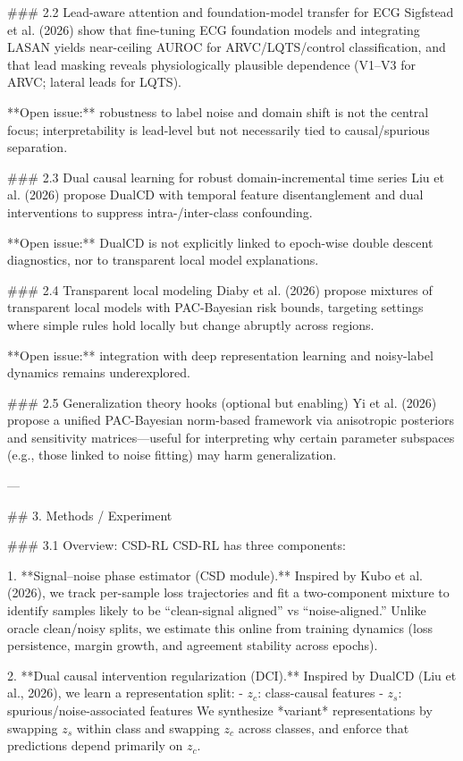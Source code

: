 ### 2.2 Lead-aware attention and foundation-model transfer for ECG  
Sigfstead et al. (2026) show that fine-tuning ECG foundation models and integrating LASAN yields near-ceiling AUROC for ARVC/LQTS/control classification, and that lead masking reveals physiologically plausible dependence (V1–V3 for ARVC; lateral leads for LQTS).

**Open issue:** robustness to label noise and domain shift is not the central focus; interpretability is lead-level but not necessarily tied to causal/spurious separation.

### 2.3 Dual causal learning for robust domain-incremental time series  
Liu et al. (2026) propose DualCD with temporal feature disentanglement and dual interventions to suppress intra-/inter-class confounding.

**Open issue:** DualCD is not explicitly linked to epoch-wise double descent diagnostics, nor to transparent local model explanations.

### 2.4 Transparent local modeling  
Diaby et al. (2026) propose mixtures of transparent local models with PAC-Bayesian risk bounds, targeting settings where simple rules hold locally but change abruptly across regions.

**Open issue:** integration with deep representation learning and noisy-label dynamics remains underexplored.

### 2.5 Generalization theory hooks (optional but enabling)  
Yi et al. (2026) propose a unified PAC-Bayesian norm-based framework via anisotropic posteriors and sensitivity matrices—useful for interpreting why certain parameter subspaces (e.g., those linked to noise fitting) may harm generalization.

---

## 3. Methods / Experiment  

### 3.1 Overview: CSD-RL  
CSD-RL has three components:

1. **Signal–noise phase estimator (CSD module).**  
   Inspired by Kubo et al. (2026), we track per-sample loss trajectories and fit a two-component mixture to identify samples likely to be “clean-signal aligned” vs “noise-aligned.” Unlike oracle clean/noisy splits, we estimate this online from training dynamics (loss persistence, margin growth, and agreement stability across epochs).

2. **Dual causal intervention regularization (DCI).**  
   Inspired by DualCD (Liu et al., 2026), we learn a representation split:
   - \(z_c\): class-causal features  
   - \(z_s\): spurious/noise-associated features  
   We synthesize *variant* representations by swapping \(z_s\) within class and swapping \(z_c\) across classes, and enforce that predictions depend primarily on \(z_c\).

